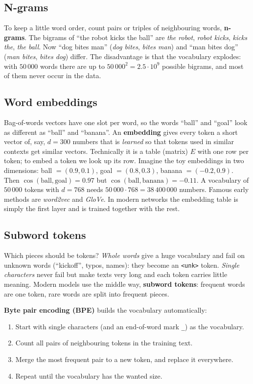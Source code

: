 \subsection*{N-grams}
To keep a little word order, count pairs or triples of neighbouring words, \textbf{n-grams}. The bigrams of ``the robot kicks the ball'' are \emph{the robot}, \emph{robot kicks}, \emph{kicks the}, \emph{the ball}. Now ``dog bites man'' (\emph{dog bites}, \emph{bites man}) and ``man bites dog'' (\emph{man bites}, \emph{bites dog}) differ. The disadvantage is that the vocabulary explodes: with $50\,000$ words there are up to $50\,000^2=2.5\cdot10^9$ possible bigrams, and most of them never occur in the data.

\subsection*{Word embeddings}
Bag-of-words vectors have one slot per word, so the words ``ball'' and ``goal'' look as different as ``ball'' and ``banana''. An \textbf{embedding} gives every token a short vector of, say, $d=300$ numbers that is \emph{learned} so that tokens used in similar contexts get similar vectors. Technically it is a table (matrix) $E$ with one row per token; to embed a token we look up its row. Imagine the toy embeddings in two dimensions: ball $=(0.9,0.1)$, goal $=(0.8,0.3)$, banana $=(-0.2,0.9)$. Then $\cos(\text{ball},\text{goal})=0.97$ but $\cos(\text{ball},\text{banana})=-0.11$. A vocabulary of $50\,000$ tokens with $d=768$ needs $50\,000\cdot768=38\,400\,000$ numbers. Famous early methods are \emph{word2vec} and \emph{GloVe}. In modern networks the embedding table is simply the first layer and is trained together with the rest.

\subsection*{Subword tokens}
Which pieces should be tokens? \emph{Whole words} give a huge vocabulary and fail on unknown words (``kickoff'', typos, names): they become an \texttt{<unk>} token. \emph{Single characters} never fail but make texts very long and each token carries little meaning. Modern models use the middle way, \textbf{subword tokens}: frequent words are one token, rare words are split into frequent pieces.

\textbf{Byte pair encoding (BPE)} builds the vocabulary automatically:
\begin{enumerate}[nosep]
  \item Start with single characters (and an end-of-word mark \texttt{\_}) as the vocabulary.
  \item Count all pairs of neighbouring tokens in the training text.
  \item Merge the most frequent pair to a new token, and replace it everywhere.
  \item Repeat until the vocabulary has the wanted size.
\end{enumerate}

